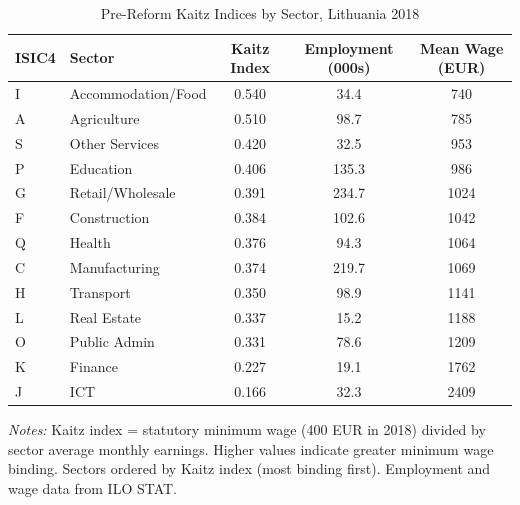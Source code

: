 \begin{table}[H]
\centering
\caption{Pre-Reform Kaitz Indices by Sector, Lithuania 2018}
\label{tab:kaitz}
\begin{threeparttable}
\begin{tabular}{llccc}
\toprule
ISIC4 & Sector & Kaitz Index & Employment (000s) & Mean Wage (EUR) \\
\midrule
I & Accommodation/Food & 0.540 & 34.4 & 740 \\
A & Agriculture & 0.510 & 98.7 & 785 \\
S & Other Services & 0.420 & 32.5 & 953 \\
P & Education & 0.406 & 135.3 & 986 \\
G & Retail/Wholesale & 0.391 & 234.7 & 1024 \\
F & Construction & 0.384 & 102.6 & 1042 \\
Q & Health & 0.376 & 94.3 & 1064 \\
C & Manufacturing & 0.374 & 219.7 & 1069 \\
H & Transport & 0.350 & 98.9 & 1141 \\
L & Real Estate & 0.337 & 15.2 & 1188 \\
O & Public Admin & 0.331 & 78.6 & 1209 \\
K & Finance & 0.227 & 19.1 & 1762 \\
J & ICT & 0.166 & 32.3 & 2409 \\
\bottomrule
\end{tabular}
\begin{tablenotes}[flushleft]
\small
\item \textit{Notes:} Kaitz index = statutory minimum wage (400 EUR in 2018) divided by sector average monthly earnings. Higher values indicate greater minimum wage binding. Sectors ordered by Kaitz index (most binding first). Employment and wage data from ILO STAT.
\end{tablenotes}
\end{threeparttable}
\end{table}
